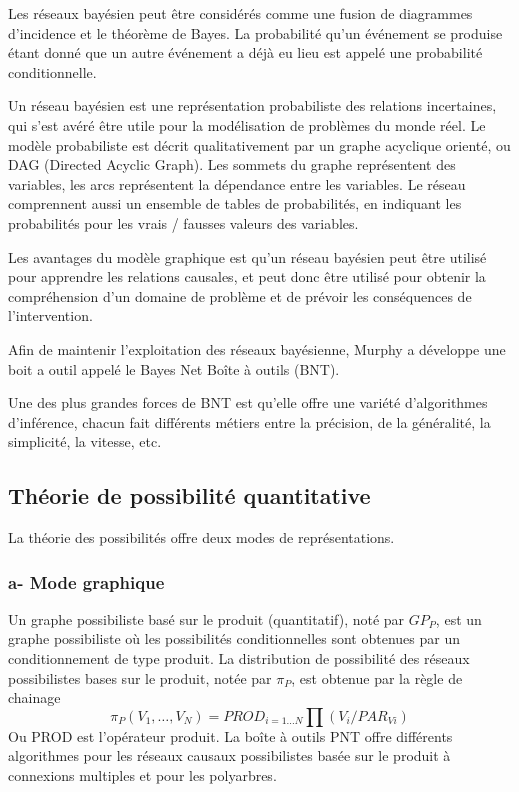 Les réseaux bayésien peut être considérés comme une fusion de diagrammes d'incidence et le théorème de Bayes. La probabilité qu'un événement se produise étant donné que un autre événement a déjà eu lieu est appelé une probabilité conditionnelle. 

Un réseau bayésien est une représentation probabiliste des relations incertaines, qui s'est avéré être utile pour la modélisation de problèmes du monde réel. Le modèle probabiliste est décrit qualitativement par un graphe acyclique orienté, ou DAG (Directed Acyclic Graph). Les sommets du graphe représentent des variables, les arcs représentent la dépendance entre les variables. Le réseau comprennent aussi un ensemble de tables de probabilités, en indiquant les probabilités pour les vrais / fausses valeurs des variables.

Les avantages du  modèle graphique est qu’un réseau bayésien peut être utilisé pour apprendre les relations causales, et peut donc être utilisé pour obtenir la compréhension d'un domaine de problème et de prévoir les conséquences de l'intervention.

Afin de maintenir l'exploitation des réseaux bayésienne, Murphy a développe une boit a outil appelé le Bayes Net Boîte à outils (BNT).

Une des plus grandes forces de BNT est qu'elle offre une variété d'algorithmes d'inférence, chacun fait différents métiers entre la précision, de la généralité, la simplicité, la vitesse, etc.


\subsection{Théorie de possibilité quantitative}

La théorie des possibilités offre deux modes de représentations.

\subsubsection{a- Mode graphique}

Un graphe possibiliste basé sur le produit (quantitatif), noté par $GP_{P}$, est un graphe possibiliste où les possibilités conditionnelles sont obtenues par un conditionnement de type produit. La distribution de possibilité des réseaux possibilistes bases sur le produit, notée par $\pi_{P}$, est obtenue par la règle de chainage 
\begin{equation}
\pi_{P} (V_1, \dots , V_N) = PROD_{i=1 \dots N} \prod  (V_i/PAR_{Vi})
\end{equation}
Ou PROD est l’opérateur produit\cite{BoBrDu2008.1}.
La boîte à outils PNT offre  différents algorithmes pour les réseaux causaux possibilistes basée sur le produit à connexions multiples et pour les polyarbres. 
